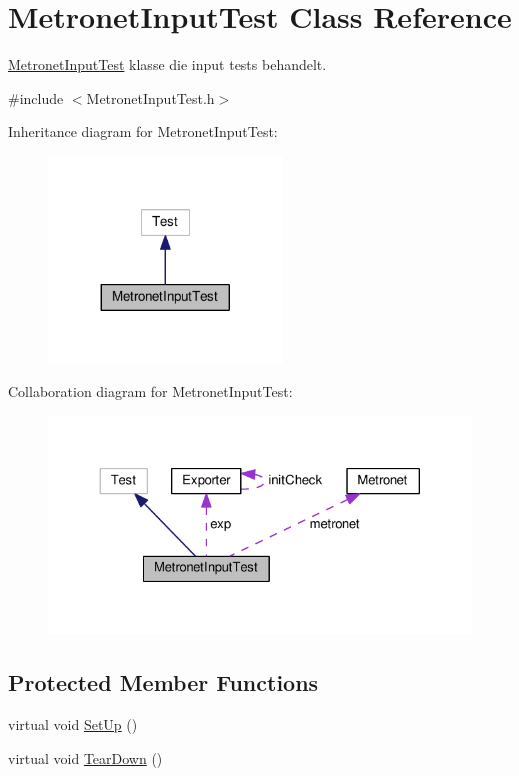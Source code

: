 \hypertarget{class_metronet_input_test}{}\section{Metronet\+Input\+Test Class Reference}
\label{class_metronet_input_test}


\hyperlink{class_metronet_input_test}{Metronet\+Input\+Test} klasse die input tests behandelt.  




{\ttfamily \#include $<$Metronet\+Input\+Test.\+h$>$}



Inheritance diagram for Metronet\+Input\+Test\+:\nopagebreak
\begin{figure}[H]
\begin{center}
\leavevmode
\includegraphics[width=176pt]{class_metronet_input_test__inherit__graph}
\end{center}
\end{figure}


Collaboration diagram for Metronet\+Input\+Test\+:
\nopagebreak
\begin{figure}[H]
\begin{center}
\leavevmode
\includegraphics[width=324pt]{class_metronet_input_test__coll__graph}
\end{center}
\end{figure}
\subsection*{Protected Member Functions}
\begin{DoxyCompactItemize}
\item 
virtual void \hyperlink{class_metronet_input_test_a863299908a545656568a7d534387e05d}{Set\+Up} ()
\item 
virtual void \hyperlink{class_metronet_input_test_a20f35cb70be79eee36b1dab816cf6806}{Tear\+Down} ()
\end{DoxyCompactItemize}
